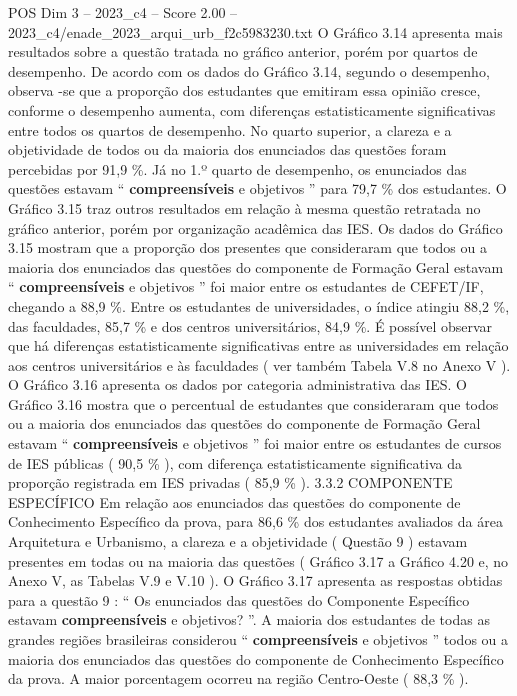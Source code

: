 \begin{textsample}{POS Dim 3 – 2023\_c4 – Score 2.00 – 2023\_c4/enade\_2023\_arqui\_urb\_f2c5983230.txt}
O Gráfico 3.14 apresenta mais resultados sobre a questão tratada no gráfico anterior, porém por quartos de desempenho.
De acordo com os dados do Gráfico 3.14, segundo o desempenho, observa -se que a proporção dos estudantes que emitiram essa opinião cresce, conforme o desempenho aumenta, com diferenças estatisticamente significativas entre todos os quartos de desempenho.
No quarto superior, a clareza e a objetividade de todos ou da maioria dos enunciados das questões foram percebidas por 91,9 \%.
Já no 1.º quarto de desempenho, os enunciados das questões estavam “ \textbf{compreensíveis} e objetivos ” para 79,7 \% dos estudantes.
O Gráfico 3.15 traz outros resultados em relação à mesma questão retratada no gráfico anterior, porém por organização acadêmica das IES.
Os dados do Gráfico 3.15 mostram que a proporção dos presentes que consideraram que todos ou a maioria dos enunciados das questões do componente de Formação Geral estavam “ \textbf{compreensíveis} e objetivos ” foi maior entre os estudantes de CEFET/IF, chegando a 88,9 \%.
Entre os estudantes de universidades, o índice atingiu 88,2 \%, das faculdades, 85,7 \% e dos centros universitários, 84,9 \%.
É possível observar que há diferenças estatisticamente significativas entre as universidades em relação aos centros universitários e às faculdades ( ver também Tabela V.8 no Anexo V ).
O Gráfico 3.16 apresenta os dados por categoria administrativa das IES.
O Gráfico 3.16 mostra que o percentual de estudantes que consideraram que todos ou a maioria dos enunciados das questões do componente de Formação Geral estavam “ \textbf{compreensíveis} e objetivos ” foi maior entre os estudantes de cursos de IES públicas ( 90,5 \% ), com diferença estatisticamente significativa da proporção registrada em IES privadas ( 85,9 \% ). 3.3.2 COMPONENTE ESPECÍFICO Em relação aos enunciados das questões do componente de Conhecimento Específico da prova, para 86,6 \% dos estudantes avaliados da área Arquitetura e Urbanismo, a clareza e a objetividade ( Questão 9 ) estavam presentes em todas ou na maioria das questões ( Gráfico 3.17 a Gráfico 4.20 e, no Anexo V, as Tabelas V.9 e V.10 ).
O Gráfico 3.17 apresenta as respostas obtidas para a questão 9 : “ Os enunciados das questões do Componente Específico estavam \textbf{compreensíveis} e objetivos? ”.
A maioria dos estudantes de todas as grandes regiões brasileiras considerou “ \textbf{compreensíveis} e objetivos ” todos ou a maioria dos enunciados das questões do componente de Conhecimento Específico da prova.
A maior porcentagem ocorreu na região Centro-Oeste ( 88,3 \% ).

\end{textsample}
